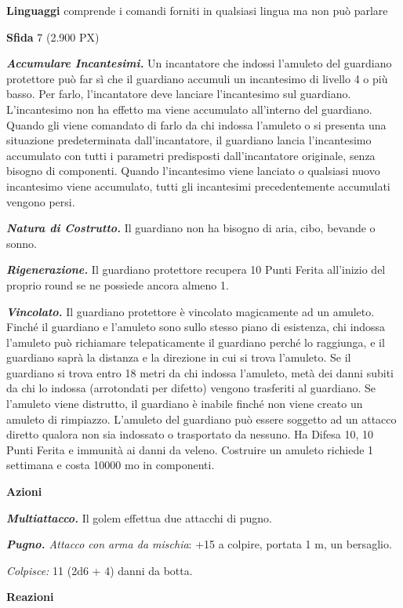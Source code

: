 \begin{multicols}{2}
	\textbf{Linguaggi} comprende i comandi forniti in qualsiasi lingua ma non può parlare

	\textbf{Sfida} 7 (2.900 PX)

	\textit{\textbf{Accumulare Incantesimi.}} Un incantatore che indossi l'amuleto del guardiano protettore può far sì che il guardiano accumuli un incantesimo di livello 4 o più basso. Per farlo, l'incantatore deve lanciare l'incantesimo sul guardiano. L'incantesimo non ha effetto ma viene accumulato all'interno del guardiano. Quando gli viene comandato di farlo da chi indossa l'amuleto o si presenta una situazione predeterminata dall'incantatore, il guardiano lancia l'incantesimo accumulato con tutti i parametri predisposti dall'incantatore originale, senza bisogno di componenti. Quando l'incantesimo viene lanciato o qualsiasi nuovo incantesimo viene accumulato, tutti gli incantesimi precedentemente accumulati vengono persi.

	\textit{\textbf{Natura di Costrutto.}} Il guardiano non ha bisogno di aria, cibo, bevande o sonno.

	\textit{\textbf{Rigenerazione.}} Il guardiano protettore recupera 10 Punti Ferita all'inizio del proprio round se ne possiede ancora almeno 1.

	\textit{\textbf{Vincolato.}} Il guardiano protettore è vincolato magicamente ad un amuleto. Finché il guardiano e l'amuleto sono sullo stesso piano di esistenza, chi indossa l'amuleto può richiamare telepaticamente il guardiano perché lo raggiunga, e il guardiano saprà la distanza e la direzione in cui si trova l'amuleto. Se il guardiano si trova entro 18 metri da chi indossa l'amuleto, metà dei danni subiti da chi lo indossa (arrotondati per difetto) vengono trasferiti al guardiano. Se l'amuleto viene distrutto, il guardiano è inabile finché non viene creato un amuleto di rimpiazzo. L'amuleto del guardiano può essere soggetto ad un attacco diretto qualora non sia indossato o trasportato da nessuno. Ha Difesa 10, 10 Punti Ferita e immunità ai danni da veleno. Costruire un amuleto richiede 1 settimana e costa 10000 mo in componenti.

	\textbf{Azioni}

	\textit{\textbf{Multiattacco.}} Il golem effettua due attacchi di pugno.

	\textit{\textbf{Pugno.} Attacco con arma da mischia}: +15 a colpire, portata 1 m, un bersaglio.

	\textit{Colpisce:} 11 (2d6 + 4) danni da botta.

	\textbf{Reazioni}


\end{multicols}
